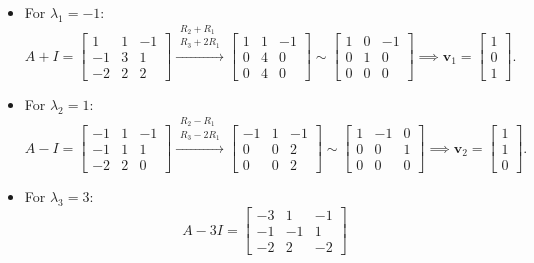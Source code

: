 \documentclass[11pt, letterpaper]{article}
\theoremstyle{definition}
\theoremstyle{remark}
\begin{document}
\begin{itemize}
    \item For $\lambda_{1} = -1$:
    \[
    A + I = \begin{bmatrix} 1 & 1 & -1 \\ -1 & 3 & 1 \\ -2 & 2 & 2 \end{bmatrix}
    \xrightarrow{\substack{R_{2} + R_{1} \\ R_{3} + 2R_{1}}}
    \begin{bmatrix} 1 & 1 & -1 \\ 0 & 4 & 0 \\ 0 & 4 & 0 \end{bmatrix}
    \sim
    \begin{bmatrix} 1 & 0 & -1 \\ 0 & 1 & 0 \\ 0 & 0 & 0 \end{bmatrix}
    \implies \mathbf{v}_{1} = \begin{bmatrix} 1 \\ 0 \\ 1 \end{bmatrix}.
    \]
    \item For $\lambda_{2} = 1$:
    \[
    A - I = \begin{bmatrix} -1 & 1 & -1 \\ -1 & 1 & 1 \\ -2 & 2 & 0 \end{bmatrix}
    \xrightarrow{\substack{R_{2} - R_{1} \\ R_{3} - 2R_{1}}}
    \begin{bmatrix} -1 & 1 & -1 \\ 0 & 0 & 2 \\ 0 & 0 & 2 \end{bmatrix}
    \sim
    \begin{bmatrix} 1 & -1 & 0 \\ 0 & 0 & 1 \\ 0 & 0 & 0 \end{bmatrix}
    \implies \mathbf{v}_{2} = \begin{bmatrix} 1 \\ 1 \\ 0 \end{bmatrix}.
    \]
    \item For $\lambda_{3} = 3$:
    \[
    A - 3I = \begin{bmatrix} -3 & 1 & -1 \\ -1 & -1 & 1 \\ -2 & 2 & -2 \end{bmatrix}
\]
\end{itemize}
\end{document}
